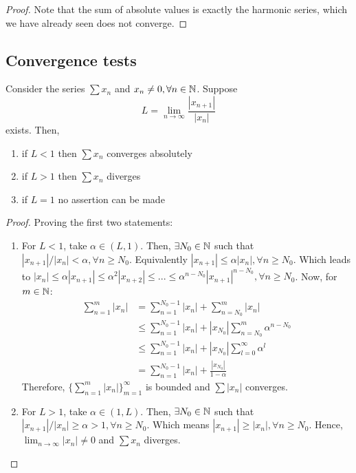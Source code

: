 \begin{proof}
    Note that the sum of absolute values is exactly the harmonic series, which we have already seen does not converge. 
\end{proof}

\subsection{Convergence tests}

\begin{theorem}
    Consider the series $\sum x_n$ and $x_n \neq 0, \forall n \in \mathbb{N}$. Suppose
    \begin{equation}
        L = \lim \limits_{n \to \infty} \frac{|x_{n+1}|}{|x_n|}
    \end{equation}
    exists. Then,
    \begin{enumerate}
        \item if $L < 1$ then $\sum x_n$ converges absolutely
        \item if $L > 1$ then $\sum x_n$ diverges
        \item if $L = 1$ no assertion can be made
    \end{enumerate}
\end{theorem}

\begin{proof}
    Proving the first two statements:
    \begin{enumerate}
        \item For $L < 1$, take $\alpha \in (L, 1)$. Then, $\exists N_0 \in \mathbb{N}$ such that $|x_{n+1}|/|x_n| < \alpha, \forall n \geq N_0$. Equivalently $|x_{n+1}| \leq \alpha |x_n|, \forall n \geq N_0$. Which leads to $|x_n| \leq \alpha |x_{n+1}| \leq \alpha^2 |x_{n+2}| \leq ... \leq \alpha^{n-N_0} |x_{n+1}|^{n-N_0}, \forall n \geq N_0$. Now, for $m \in \mathbb{N}$:
        \begin{align*}
            \sum \limits_{n=1}^m |x_n| &= \sum \limits_{n=1}^{N_0-1}|x_n| + \sum \limits_{n=N_0}^{m}|x_n| \\
            &\leq \sum \limits_{n=1}^{N_0-1}|x_n| + |x_{N_0}| \sum \limits_{n=N_0}^{m} \alpha^{n-N_0} \\
            &\leq \sum \limits_{n=1}^{N_0-1}|x_n| + |x_{N_0}| \sum \limits_{l=0}^{\infty} \alpha^l \\
            &= \sum \limits_{n=1}^{N_0-1}|x_n| + \frac{|x_{N_0}|}{1-\alpha}
        \end{align*}
        Therefore, $\{ \sum_{n=1}^m |x_n|\}_{m=1}^\infty$ is bounded and $\sum |x_n|$ converges.
        \item For $L > 1$, take $\alpha \in (1, L)$. Then, $\exists N_0 \in \mathbb{N}$ such that $|x_{n+1}|/|x_n| \geq \alpha > 1, \forall n \geq N_0$. Which means $|x_{n+1}| \geq |x_n|, \forall n \geq N_0$. Hence, $\lim_{n \to \infty} |x_n| \neq 0$ and $\sum x_n$ diverges.
    \end{enumerate}
\end{proof}